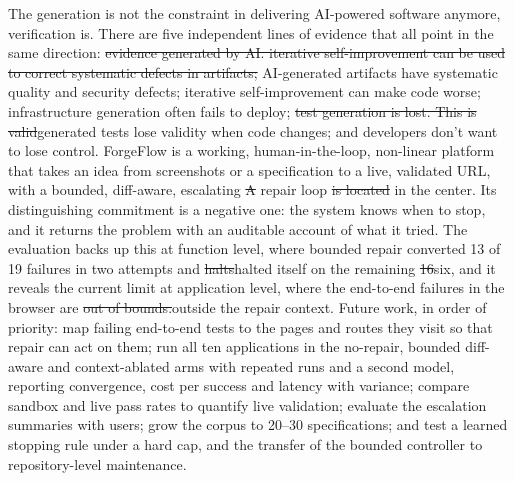 \documentclass[pdflatex,sn-mathphys-num]{sn-jnl}%
\newcommand{\fix}[1]{{\color{fixcol}#1}}
\newcommand{\fixdel}[1]{{\color{fixcol}\sout{#1}}}
\newcommand{\rw}[2]{{\color{rwcol}#1}}%
\theoremstyle{thmstyleone}%
\theoremstyle{thmstyletwo}%
\theoremstyle{thmstylethree}%
\begin{document}
\rw{The generation is not the constraint in delivering AI-powered software anymore, verification is. There are five independent lines of evidence that all point in the same direction: \fixdel{evidence generated by AI. iterative self-improvement can be used to correct systematic defects in artifacts;} \fix{AI-generated} artifacts have systematic quality and security defects; \fix{iterative self-improvement can} make code worse; infrastructure generation often fails to deploy; \fixdel{test generation is lost. This is valid}\fix{generated tests lose validity} when code changes; and developers don't want to lose control. ForgeFlow is a working, human-in-the-loop, non-linear platform that takes an idea from screenshots or a specification to a live, validated URL, with a bounded, diff-aware, escalating \fixdel{A} repair loop \fixdel{is located} in the center. Its distinguishing commitment is a negative one: the system knows when to stop, and it returns the problem with an auditable account of what it tried. The evaluation backs up this at function level, where bounded repair converted 13 of 19 failures in two attempts and \fixdel{halts}\fix{halted} itself on the remaining \fixdel{16}\fix{six}, and it reveals the current limit at application level, where the end-to-end failures in the browser are \fixdel{out of bounds.}\fix{outside} the repair context.}{Generation is no longer the limiting factor in AI-powered software delivery; verification is. Five independent lines of 2025--2026 evidence point the same way: AI-generated artifacts carry systematic quality and security defects; iterative self-improvement can make code worse; generated infrastructure often fails to deploy; generated tests lose validity when code changes; and developers do not want to give up control. ForgeFlow is a working, human-in-the-loop, non-linear platform that takes an idea from screenshots or a specification to a live, validated URL, with a bounded, diff-aware, escalating repair loop at its centre. Its distinguishing commitment is a negative one: the system knows when to stop, and it returns the problem with an auditable account of what it tried. The evaluation supports this at function level, where bounded repair converted 13 of 19 failures within two attempts and stopped itself on the rest, and it exposes the current limit at application level, where browser end-to-end failures fall outside the repair context.} Future work, in order of priority: map failing end-to-end tests to the pages and routes they visit so that repair can act on them; run all ten applications in the no-repair, bounded diff-aware and context-ablated arms with repeated runs and a second model, reporting convergence, cost per success and latency with variance; compare sandbox and live pass rates to quantify live validation; evaluate the escalation summaries with users; grow the corpus to 20--30 specifications; and test a learned stopping rule under a hard cap, and the transfer of the bounded controller to repository-level maintenance.
\end{document}
